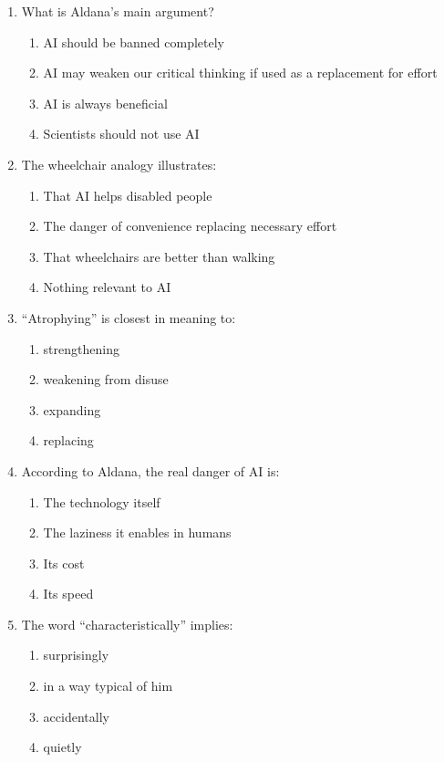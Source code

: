 \documentclass[10pt,a4paper]{article}
\begin{document}
\begin{enumerate}[label=\textbf{\arabic*.}]
\item What is Aldana's main argument?
\begin{enumerate}[label=(\Alph*)]
\item AI should be banned completely
\item AI may weaken our critical thinking if used as a replacement for effort
\item AI is always beneficial
\item Scientists should not use AI
\end{enumerate}

\item The wheelchair analogy illustrates:
\begin{enumerate}[label=(\Alph*)]
\item That AI helps disabled people
\item The danger of convenience replacing necessary effort
\item That wheelchairs are better than walking
\item Nothing relevant to AI
\end{enumerate}

\item ``Atrophying'' is closest in meaning to:
\begin{enumerate}[label=(\Alph*)]
\item strengthening \item weakening from disuse
\item expanding \item replacing
\end{enumerate}

\item According to Aldana, the real danger of AI is:
\begin{enumerate}[label=(\Alph*)]
\item The technology itself
\item The laziness it enables in humans
\item Its cost
\item Its speed
\end{enumerate}

\item The word ``characteristically'' implies:
\begin{enumerate}[label=(\Alph*)]
\item surprisingly \item in a way typical of him
\item accidentally \item quietly
\end{enumerate}
\end{enumerate}
\end{document}
